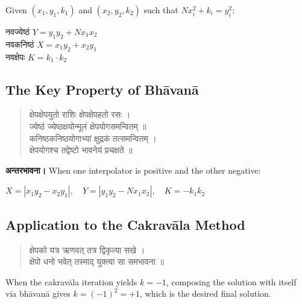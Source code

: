 \documentclass[11pt,a4paper]{article}
\newcommand{\dev}[1]{{\devanagarifont #1}}
\newenvironment{sanskritverse}{%
  \begin{verse}
}{%
  \end{verse}
}
\begin{document}
\vs

\noindent Given $(x_1, y_1, k_1)$ and $(x_2, y_2, k_2)$ such that $Nx_i^2 + k_i = y_i^2$:

\begin{center}
\dev{%
नवज्येष्ठं $Y = y_1 y_2 + N x_1 x_2$}\\[0.3em]
\dev{%
नवकनिष्ठं $X = x_1 y_2 + x_2 y_1$}\\[0.3em]
\dev{%
नवक्षेपः $K = k_1 \cdot k_2$}
\end{center}

\vs

\subsection*{The Key Property of Bh\={a}van\={a}}

\begin{sanskritverse}
\dev{%
क्षेपक्षेपयुतो राशिः क्षेपक्षेपहतो रसः ।\\
ज्येष्ठं ज्येष्ठक्षयोन्मूलं क्षेपयोगसमन्वितम् ॥}\\[0.5em]
\dev{%
कनिष्ठकनिष्ठयोगाभ्यां क्षुद्रकं तत्समन्वितम् ।\\
क्षेपयोगश्च तद्वेष्टो भावनेयं प्रचक्षते ॥}
\end{sanskritverse}

\vs

\noindent\textbf{\dev{अन्तरभावना।}} When one interpolator is positive and the other negative:

\begin{center}
\dev{%
$X = |x_1 y_2 - x_2 y_1|, \quad Y = |y_1 y_2 - N x_1 x_2|, \quad K = -k_1 k_2$}
\end{center}

\vs

\subsection*{Application to the Cakrav\={a}la Method}

\begin{sanskritverse}
\dev{%
क्षेपको यत्र ऋणवत् तत्र द्विकृत्या सखे ।\\
क्षेपो धनो भवेत् तस्माद् युक्त्या सा समभावना ॥}
\end{sanskritverse}

\noindent When the cakrav\={a}la iteration yields $k = -1$, composing the solution with itself via bh\={a}van\={a} gives $k = (-1)^2 = +1$, which is the desired final solution.

\vs
\end{document}
